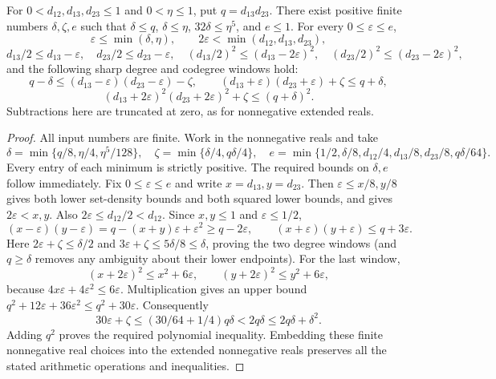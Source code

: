 \begin{lemma}
For $0<d_{12},d_{13},d_{23}\leq1$ and $0<\eta\leq1$, put
$q=d_{13}d_{23}$. There exist positive finite numbers $\delta,\zeta,e$
such that $\delta\leq q$, $\delta\leq\eta$,
$32\delta\leq\eta^5$, and $e\leq1$. For every $0\leq\varepsilon\leq e$,
\[
 \varepsilon\leq\min(\delta,\eta),\qquad
 2\varepsilon<\min(d_{12},d_{13},d_{23}),
\]
\[
 d_{13}/2\leq d_{13}-\varepsilon,\quad
 d_{23}/2\leq d_{23}-\varepsilon,\quad
 (d_{13}/2)^2\leq(d_{13}-2\varepsilon)^2,\quad
 (d_{23}/2)^2\leq(d_{23}-2\varepsilon)^2,
\]
and the following sharp degree and codegree windows hold:
\[
 q-\delta\leq(d_{13}-\varepsilon)(d_{23}-\varepsilon)-\zeta,
 \qquad (d_{13}+\varepsilon)(d_{23}+\varepsilon)+\zeta\leq q+\delta,
\]
\[
 (d_{13}+2\varepsilon)^2(d_{23}+2\varepsilon)^2+\zeta
 \leq(q+\delta)^2.
\]
Subtractions here are truncated at zero, as for nonnegative extended reals.
\end{lemma}
\begin{proof}
All input numbers are finite. Work in the nonnegative reals and take
\[
 \delta=\min\{q/8,\eta/4,\eta^5/128\},\quad
 \zeta=\min\{\delta/4,q\delta/4\},\quad
 e=\min\{1/2,\delta/8,d_{12}/4,d_{13}/8,d_{23}/8,q\delta/64\}.
\]
Every entry of each minimum is strictly positive. The required bounds on
$\delta,e$ follow immediately. Fix $0\leq\varepsilon\leq e$ and write
$x=d_{13},y=d_{23}$. Then $\varepsilon\leq x/8,y/8$ gives both
lower set-density bounds and both squared lower bounds, and gives
$2\varepsilon<x,y$. Also $2\varepsilon\leq d_{12}/2<d_{12}$.
Since $x,y\leq1$ and $\varepsilon\leq1/2$,
\[
 (x-\varepsilon)(y-\varepsilon)
 =q-(x+y)\varepsilon+\varepsilon^2\geq q-2\varepsilon,
 \qquad
 (x+\varepsilon)(y+\varepsilon)\leq q+3\varepsilon.
\]
Here $2\varepsilon+\zeta\leq\delta/2$ and
$3\varepsilon+\zeta\leq5\delta/8\leq\delta$, proving the two
degree windows (and $q\geq\delta$ removes any ambiguity about their
lower endpoints). For the last window,
\[
 (x+2\varepsilon)^2\leq x^2+6\varepsilon,\qquad
 (y+2\varepsilon)^2\leq y^2+6\varepsilon,
\]
because $4x\varepsilon+4\varepsilon^2\leq6\varepsilon$.
Multiplication gives an upper bound
$q^2+12\varepsilon+36\varepsilon^2\leq q^2+30\varepsilon$.
Consequently
\[
 30\varepsilon+\zeta\leq(30/64+1/4)q\delta
 <2q\delta\leq2q\delta+\delta^2.
\]
Adding $q^2$ proves the required polynomial inequality. Embedding these
finite nonnegative real choices into the extended nonnegative reals
preserves all the stated arithmetic operations and inequalities.
\end{proof}
